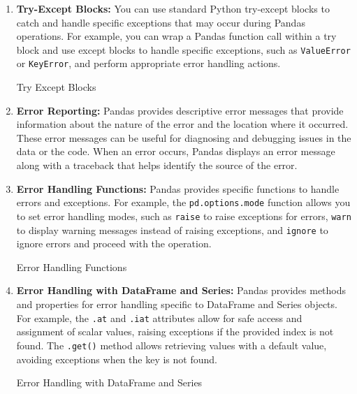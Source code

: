 	\begin{enumerate}
		\item \textbf{Try-Except Blocks:} You can use standard Python try-except blocks to catch and handle specific exceptions that may occur during Pandas operations. For example, you can wrap a Pandas function call within a try block and use except blocks to handle specific exceptions, such as \texttt{ValueError} or \texttt{KeyError}, and perform appropriate error handling actions.
		
			\begin{code}[h!]
			    
			
			\caption{Try Except Blocks}
			
			\end{code}
		
	\item \textbf{Error Reporting:} Pandas provides descriptive error messages that provide information about the nature of the error and the location where it occurred. These error messages can be useful for diagnosing and debugging issues in the data or the code. When an error occurs, Pandas displays an error message along with a traceback that helps identify the source of the error.
	
	\item \textbf{Error Handling Functions:} Pandas provides specific functions to handle errors and exceptions. For example, the \texttt{pd.options.mode} function allows you to set error handling modes, such as \texttt{raise} to raise exceptions for errors, \texttt{warn} to display warning messages instead of raising exceptions, and \texttt{ignore} to ignore errors and proceed with the operation.
	
		\begin{code}[h!]
		    
		
		\caption{Error Handling Functions}
		
	\end{code}
	
	\item \textbf{Error Handling with DataFrame and Series:} Pandas provides methods and properties for error handling specific to DataFrame and Series objects. For example, the \texttt{.at} and \texttt{.iat} attributes allow for safe access and assignment of scalar values, raising exceptions if the provided index is not found. The \texttt{.get()} method allows retrieving values with a default value, avoiding exceptions when the key is not found.
	
	\begin{code}[h!]
		    
		
		\caption{Error Handling with DataFrame and Series}

	\end{code}
	
	\end{enumerate}
	
